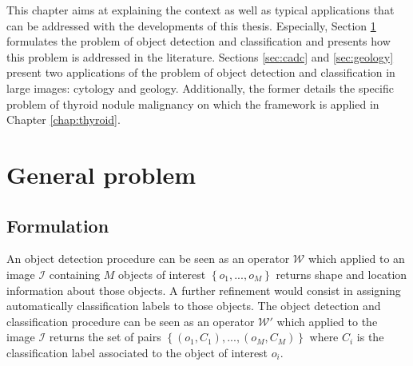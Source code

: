 \label{chap:context}
This chapter aims at explaining the context as well as typical applications that can be addressed with the developments of this thesis. Especially, Section \ref{sec:detect_general} formulates the problem of object detection and  classification and presents how this problem is addressed in the literature. Sections \ref{sec:cadc} and \ref{sec:geology} present two applications of the problem of object detection and classification in large images: cytology and geology. Additionally, the former details the specific problem of thyroid nodule malignancy on which the framework is applied in Chapter \ref{chap:thyroid}. 

\section{General problem}
\label{sec:detect_general}
\subsection{Formulation}
An object detection procedure can be seen as an operator $\mathcal{W}$ which applied to an image $\mathcal{I}$ containing $M$ objects of interest $\left\{o_1,...,o_M\right\}$ returns shape and location information about those objects. A further refinement would consist in assigning automatically classification labels to those objects. The object detection and classification procedure can be seen as an operator $\mathcal{W}'$ which applied to the image $\mathcal{I}$ returns the set of pairs $\left\{\left(o_1, C_1\right), ..., \left(o_M, C_M\right)\right\}$ where $C_i$ is the classification label associated to the object of interest $o_i$. 

